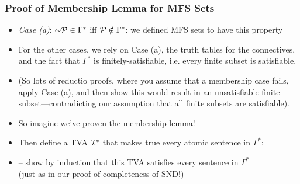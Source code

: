 \begin{frame}
\frametitle{Proof of Membership Lemma for MFS Sets}

\begin{itemize}[<+->]

\item \emph{Case (a)}: $\enot \metav{P} \in \Gamma^{\ast}$ iff $\mathcal{P} \notin \Gamma^{\ast}$: we defined MFS sets to have this property

\item For the other cases, we rely on Case (a), the truth tables for the connectives, and the fact that $\Gamma^{\ast}$ is finitely-satisfiable, i.e. every finite subset is satisfiable. 

\item[] (So lots of reductio proofs, where you assume that a membership case fails, apply Case (a), and then show this would result in an unsatisfiable finite subset---contradicting our assumption that all finite subsets are satisfiable).  

\item \textcolor{highlightB}{So imagine we've proven the membership lemma!} 

\item Then define a TVA $\mathcal{I}^{\ast}$ that makes true every atomic sentence in $\Gamma^{\ast}$; 
\item[] -- show by induction that this TVA satisfies every sentence in $\Gamma^{\ast}$ \\ (just as in our proof of completeness of SND!)

\end{itemize}
\end{frame}

\fi %












